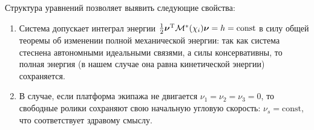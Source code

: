 Структура уравнений позволяет выявить следующие свойства:
\begin{enumerate}
    \item Система допускает интеграл энергии $\frac{1}{2}\boldsymbol{\mathbf{\nu}}^\mathrm{T}\mathcal{M}^*(\chi_i)\boldsymbol{\mathbf{\nu}} = h = \mathrm{const}$ в силу общей теоремы об изменении полной механической энергии: так как система стеснена автономными идеальными связями, а силы консервативны, то полная энергия (в нашем случае она равна кинетической энергии) сохраняется.
    
    \item В случае, если платформа экипажа не двигается $\nu_1 = \nu_2 = \nu_3 = 0$, то свободные ролики сохраняют свою начальную угловую скорость: $\nu_s = \mathrm{const}$, что соответствует здравому смыслу. 
   

\end{enumerate}
